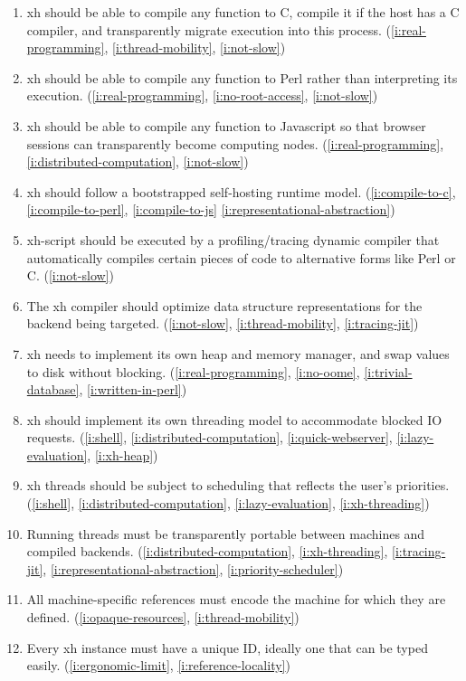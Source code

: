 \documentclass{report}
\begin{document}
\begin{enumerate}
\item{}\label{i:compile-to-c}
  xh should be able to compile any function to C, compile it if the host
  has a C compiler, and transparently migrate execution into this process.
    (\ref{i:real-programming},
     \ref{i:thread-mobility},
     \ref{i:not-slow})
\item{}\label{i:compile-to-perl}
  xh should be able to compile any function to Perl rather than
  interpreting its execution.
    (\ref{i:real-programming},
     \ref{i:no-root-access},
     \ref{i:not-slow})
\item{}\label{i:compile-to-js}
  xh should be able to compile any function to Javascript so that browser
  sessions can transparently become computing nodes.
    (\ref{i:real-programming},
     \ref{i:distributed-computation},
     \ref{i:not-slow})
\item{}\label{i:self-hosting-runtime}
  xh should follow a bootstrapped self-hosting runtime model.
    (\ref{i:compile-to-c},
     \ref{i:compile-to-perl},
     \ref{i:compile-to-js}
     \ref{i:representational-abstraction})
\item{}\label{i:tracing-jit}
  xh-script should be executed by a profiling/tracing dynamic compiler that
  automatically compiles certain pieces of code to alternative forms like
  Perl or C.
    (\ref{i:not-slow})
\item{}\label{i:representational-abstraction}
  The xh compiler should optimize data structure representations for the
  backend being targeted.
    (\ref{i:not-slow},
     \ref{i:thread-mobility},
     \ref{i:tracing-jit})

\item{}\label{i:xh-heap}
  xh needs to implement its own heap and memory manager, and swap values to
  disk without blocking.
    (\ref{i:real-programming},
     \ref{i:no-oome},
     \ref{i:trivial-database},
     \ref{i:written-in-perl})
\item{}\label{i:xh-threading}
  xh should implement its own threading model to accommodate blocked IO
  requests.
    (\ref{i:shell},
     \ref{i:distributed-computation},
     \ref{i:quick-webserver},
     \ref{i:lazy-evaluation},
     \ref{i:xh-heap})
\item{}\label{i:priority-scheduler}
  xh threads should be subject to scheduling that reflects the user's
  priorities.
    (\ref{i:shell},
     \ref{i:distributed-computation},
     \ref{i:lazy-evaluation},
     \ref{i:xh-threading})
\item{}\label{i:thread-mobility}
  Running threads must be transparently portable between machines and
  compiled backends.
    (\ref{i:distributed-computation},
     \ref{i:xh-threading},
     \ref{i:tracing-jit},
     \ref{i:representational-abstraction},
     \ref{i:priority-scheduler})
\item{}\label{i:reference-locality}
  All machine-specific references must encode the machine for which they
  are defined.
    (\ref{i:opaque-resources},
     \ref{i:thread-mobility})
\item{}\label{i:unique-ids}
  Every xh instance must have a unique ID, ideally one that can be typed
  easily.
    (\ref{i:ergonomic-limit},
     \ref{i:reference-locality})


\end{enumerate}
\end{document}
